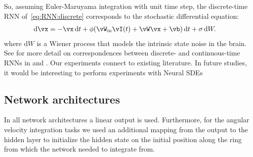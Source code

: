 \documentclass{article} %
\newcounter{ct}
\newcommand{\dm}[1]{\ensuremath{\mathrm{d}{#1}}} %
\newcommand{\win}{\vW_{\text{in}}}
\newcommand{\wout}{\vW_{\text{out}}}
\newcommand{\bout}{\vb_{\text{out}}}
\theoremstyle{definition}
\theoremstyle{remark}
\begin{document}
So, assuming Euler-Maruyama integration with unit time step, the discrete-time RNN of~\eqref{eq:RNN:discrete} corresponds to the stochastic differential equation:
\begin{align}
    \dm{\vx} &= -\vx\,\dm{t} + \phi(\win \vI(t) + \vW \vx + \vb)\,\dm{t} + \sigma\,\dm{W}. \label{eq:RNN:continuous}
\end{align}where \(\dm{W}\) is a Wiener process that models the intrinsic state noise in the brain.
See for more detail on correspondences between discrete- and continuous-time RNNs in \citep{monfared2020transformation} and \citep{ozaki2012time}.
Our experiments connect to existing literature. In future studies, it would be interesting to perform experiments with Neural SDEs \citep{tzen2019neural}


%

\subsection{Network architectures}
In all network architectures a linear output is used.
Furthermore, for the angular velocity integration tasks we used an additional mapping from the output to the hidden layer to initialize the hidden state on the initial position along the ring from which the network needed to integrate from.
\end{document}

